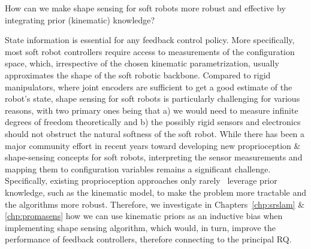 \begin{researchquestion}\label{rq:shape_sensing}
    How can we make shape sensing for soft robots more robust and effective by integrating prior (kinematic) knowledge?
\end{researchquestion}
State information is essential for any feedback control policy. More specifically, most soft robot controllers require access to measurements of the configuration space, which, irrespective of the chosen kinematic parametrization, usually approximates the shape of the soft robotic backbone.
Compared to rigid manipulators, where joint encoders are sufficient to get a good estimate of the robot's state, shape sensing for soft robots is particularly challenging for various reasons, with two primary ones being that a) we would need to measure infinite degrees of freedom theoretically and b) the possibly rigid sensors and electronics should not obstruct the natural softness of the soft robot.
While there has been a major community effort in recent years toward developing new proprioception \& shape-sensing concepts for soft robots, interpreting the sensor measurements and mapping them to configuration variables remains a significant challenge. Specifically, existing proprioception approaches only rarely~\cite{stella2023soft} leverage prior knowledge, such as the kinematic model, to make the problem more tractable and the algorithms more robust.
Therefore, we investigate in Chapters~\ref{chp:srslam} \& \ref{chp:promasens} how we can use kinematic priors as an inductive bias when implementing shape sensing algorithm, which would, in turn, improve the performance of feedback controllers, therefore connecting to the principal \gls{RQ}.

